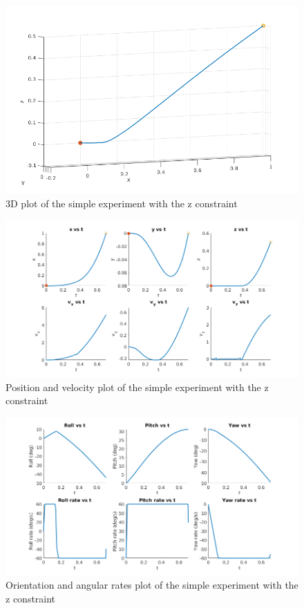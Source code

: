 \documentclass[letterpaper, 10 pt, conference]{ieeeconf}  %
\begin{document}
\begin{figure}[!htpb]
	\centering
	\includegraphics[width=1.0\linewidth]{Images/simple_zconstr/3d.png}
	\caption{3D plot of the simple experiment with the z constraint}
	\label{fig:simple_zconstr_3d}
\end{figure}
\begin{figure}[!htpb]
	\centering
	\includegraphics[width=1.0\linewidth]{Images/simple_zconstr/pos_vel.png}
	\caption{Position and velocity plot of the simple experiment with the z constraint}
	\label{fig:simple_zconstr_pos_vel}
\end{figure}
\begin{figure}[!htpb]
	\centering
	\includegraphics[width=1.0\linewidth]{Images/simple_zconstr/orient_rates.png}
	\caption{Orientation and angular rates plot of the simple experiment with the z constraint}
	\label{fig:simple_zconstr_orient_rates}
\end{figure}
\end{document}
